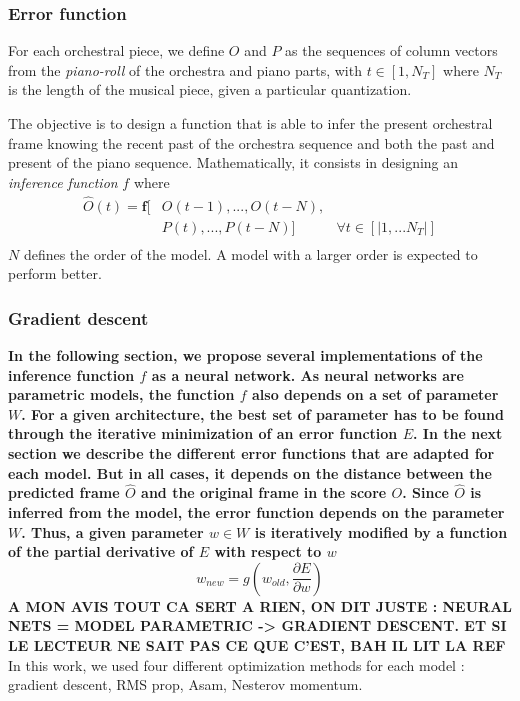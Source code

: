 \documentclass{article}
\begin{document}
\subsubsection{Error function}
For each orchestral piece, we define $O$ and $P$ as the sequences of column vectors from the \textit{piano-roll} of the orchestra and piano parts, with $t \in \left[ 1,N_{T} \right]$ where $N_{T}$ is the length of the musical piece, given a particular quantization.

The objective is to design a function that is able to infer the present orchestral frame knowing the recent past of the orchestra sequence and both the past and present of the piano sequence. Mathematically, it consists in designing an \textit{inference function} $f$ where
\begin{equation}
\begin{aligned}
\hat{O}(t) = \bm{f}\lbrack & O(t-1), ..., O(t-N), & \\
	& P(t), ... ,P(t-N) \rbrack & \forall t \in \left\lbrack|1, ... N_{T}|\right\rbrack\\
\end{aligned}
\label{eq:inference_function}
\end{equation}
$N$ defines the order of the model. A model with a larger order is expected to perform better.

\subsubsection{Gradient descent}
\textbf{In the following section, we propose several implementations of the inference function $f$ as a neural network.
As neural networks are parametric models, the function $f$ also depends on a set of parameter $W$. For a given architecture, the best set of parameter has to be found through the iterative minimization of an error function $E$.
In the next section we describe the different error functions that are adapted for each model.
But in all cases, it depends on the distance between the predicted frame $\hat{O}$ and the original frame in the score $O$. Since $\hat{O}$ is inferred from the model, the error function depends on the parameter $W$.
Thus, a given parameter $w \in W$ is iteratively modified by a function of the partial derivative of $E$ with respect to $w$
\[
w_{new} = g(w_{old}, \frac{\partial E}{\partial w})
\]
} \textbf{A MON AVIS TOUT CA SERT A RIEN, ON DIT JUSTE : NEURAL NETS = MODEL PARAMETRIC -> GRADIENT DESCENT. ET SI LE LECTEUR NE SAIT PAS CE QUE C'EST, BAH IL LIT LA REF}
In this work, we used four different optimization methods for each model : gradient descent, RMS prop, Asam, Nesterov momentum.
\end{document}

